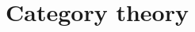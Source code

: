 \documentclass[aps,twocolumn]{revtex4-1}
\begin{document}

%


\appendix

\section{Category theory}\label{app:CatTh}


%
\end{document}
